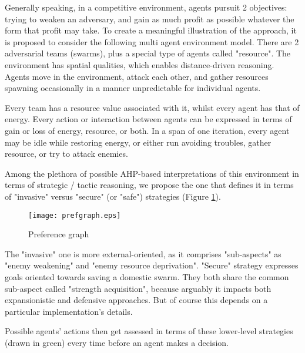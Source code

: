 Generally speaking, in a competitive environment, agents pursuit 2 objectives: trying to weaken an adversary, and gain
as much profit as possible whatever the form that profit may take. To create a meaningful illustration of the approach,
it is proposed to consider the following multi agent environment model. There are 2 adversarial teams (swarms), plus a
special type of agents called "resource". The environment has spatial qualities, which enables distance-driven
reasoning. Agents move in the environment, attack each other, and gather resources spawning occasionally in a manner
unpredictable for individual agents.

Every team has a resource value associated with it, whilst every agent has that of energy. Every action or interaction
between agents can be expressed in terms of gain or loss of energy, resource, or both. In a span of one iteration, every
agent may be idle while restoring energy, or either run avoiding troubles, gather resource, or try to attack enemies.

Among the plethora of possible AHP-based interpretations of this environment in terms of strategic / tactic reasoning,
we propose the one that defines it in terms of "invasive" versus "secure" (or "safe") strategies (Figure
\ref{fig:prefgraph-simulation}).

\begin{figure}[hbt!]
    \centering
    \texttt{[image: prefgraph.eps]}

    \caption{\small Preference graph}
    \label{fig:prefgraph-simulation}
\end{figure}

The "invasive" one is more external-oriented, as it comprises "sub-aspects" as "enemy weakening" and "enemy resource
deprivation". "Secure" strategy expresses goals oriented towards saving a domestic swarm. They both share the common
sub-aspect called "strength acquisition", because arguably it impacts both expansionistic and defensive approaches. But
of course this depends on a particular implementation's details.

Possible agents' actions then get assessed in terms of these lower-level strategies (drawn in green) every time before
an agent makes a decision.